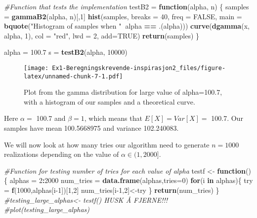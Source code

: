 \documentclass[
]{article}
\newenvironment{Shaded}{\begin{snugshade}}{\end{snugshade}}
\newcommand{\CommentTok}[1]{\textcolor[rgb]{0.56,0.35,0.01}{\textit{#1}}}
\newcommand{\ControlFlowTok}[1]{\textcolor[rgb]{0.13,0.29,0.53}{\textbf{#1}}}
\newcommand{\DataTypeTok}[1]{\textcolor[rgb]{0.13,0.29,0.53}{#1}}
\newcommand{\DecValTok}[1]{\textcolor[rgb]{0.00,0.00,0.81}{#1}}
\newcommand{\FloatTok}[1]{\textcolor[rgb]{0.00,0.00,0.81}{#1}}
\newcommand{\KeywordTok}[1]{\textcolor[rgb]{0.13,0.29,0.53}{\textbf{#1}}}
\newcommand{\NormalTok}[1]{#1}
\newcommand{\OperatorTok}[1]{\textcolor[rgb]{0.81,0.36,0.00}{\textbf{#1}}}
\newcommand{\OtherTok}[1]{\textcolor[rgb]{0.56,0.35,0.01}{#1}}
\newcommand{\StringTok}[1]{\textcolor[rgb]{0.31,0.60,0.02}{#1}}
\begin{document}
\begin{Shaded}
\begin{Highlighting}[]
\CommentTok{#Function that tests the implementation}
\NormalTok{testB2 =}\StringTok{ }\ControlFlowTok{function}\NormalTok{(alpha, n) \{}
\NormalTok{  samples =}\StringTok{ }\KeywordTok{gammaB2}\NormalTok{(alpha, n)[,}\DecValTok{1}\NormalTok{]}
  \KeywordTok{hist}\NormalTok{(samples, }\DataTypeTok{breaks =} \DecValTok{40}\NormalTok{, }\DataTypeTok{freq =} \OtherTok{FALSE}\NormalTok{, }\DataTypeTok{main =} \KeywordTok{bquote}\NormalTok{(}\StringTok{"Histogram of samples when "}\OperatorTok{~}\NormalTok{alpha }\OperatorTok{==}\StringTok{ }\NormalTok{.(alpha)))}
  \KeywordTok{curve}\NormalTok{(}\KeywordTok{dgamma}\NormalTok{(x, alpha, }\DecValTok{1}\NormalTok{), }\DataTypeTok{col =} \StringTok{"red"}\NormalTok{, }\DataTypeTok{lwd =} \DecValTok{2}\NormalTok{, }\DataTypeTok{add=}\OtherTok{TRUE}\NormalTok{)}
  \KeywordTok{return}\NormalTok{(samples)}
\NormalTok{\}}

\NormalTok{alpha =}\StringTok{ }\FloatTok{100.7}
\NormalTok{s =}\StringTok{ }\KeywordTok{testB2}\NormalTok{(alpha, }\DecValTok{10000}\NormalTok{)}
\end{Highlighting}
\end{Shaded}

\begin{figure}
\centering
\texttt{[image: Ex1-Beregningskrevende-inspirasjon2\_files/figure-latex/unnamed-chunk-7-1.pdf]}
\caption{Plot from the gamma distribution for large value of
alpha=100.7, with a histogram of our samples and a theoretical curve.}
\end{figure}

Here \(\alpha =\) 100.7 and \(\beta=1\), which means that
\(E[X]=Var[X]=\) 100.7. Our samples have mean 100.5668975 and variance
102.240083.

We will now look at how many tries our algorithm need to generate
\(n=1000\) realizations depending on the value of
\(\alpha \in (1,2000]\).

\begin{Shaded}
\begin{Highlighting}[]
\CommentTok{#Function for testing number of tries for each value of alpha}
\NormalTok{testf <-}\StringTok{ }\ControlFlowTok{function}\NormalTok{()\{}
\NormalTok{alphas =}\StringTok{ }\DecValTok{2}\OperatorTok{:}\DecValTok{2000}
\NormalTok{num_tries =}\StringTok{ }\KeywordTok{data.frame}\NormalTok{(alphas,}\DataTypeTok{tries=}\DecValTok{0}\NormalTok{)}
\ControlFlowTok{for}\NormalTok{(i }\ControlFlowTok{in}\NormalTok{ alphas)\{}
\NormalTok{  try =}\StringTok{ }\KeywordTok{f}\NormalTok{(}\DecValTok{1000}\NormalTok{,alphas[i}\DecValTok{-1}\NormalTok{])[}\DecValTok{1}\NormalTok{,}\DecValTok{2}\NormalTok{]}
\NormalTok{  num_tries[i}\DecValTok{-1}\NormalTok{,}\DecValTok{2}\NormalTok{]<-try}
\NormalTok{\}}
\KeywordTok{return}\NormalTok{(num_tries)}
\NormalTok{\}}
\CommentTok{#testing_large_alphas<- testf() HUSK Å FJERNE!!!}
\CommentTok{#plot(testing_large_alphas)}
\end{Highlighting}
\end{Shaded}
\end{document}

